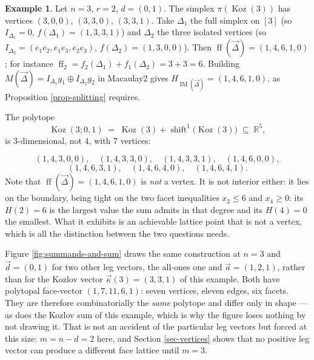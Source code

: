 \documentclass[11pt, a4paper, abstract=yes]{scrartcl}
\theoremstyle{definition}
\newtheorem{mexample}[definition]{Example}
\theoremstyle{remark}
\theoremstyle{plain}
\newcommand{\Koz}{\operatorname{Koz}}
\newcommand{\shift}{\operatorname{shift}}
\newcommand{\kozvec}{\vec\kappa}
\newcommand{\proj}{\pi}
\newcommand{\ff}{\operatorname{ff}}
\newcommand{\IM}{\operatorname{IM}}
\begin{document}
\begin{mexample}
Let \(n=3\), \(r=2\), \(d=(0,1)\). The simplex \(\proj(\Koz(3))\) has vertices \((3,0,0)\),
\((3,3,0)\), \((3,3,1)\).
Take \(\Delta_1\) the full simplex on \([3]\) (so \(I_{\Delta_1}=0\), \(f(\Delta_1)=(1,3,3,1)\)) and
\(\Delta_2\) the three isolated vertices (so \(I_{\Delta_2}=(e_1e_2,e_1e_3,e_2e_3)\),
\(f(\Delta_2)=(1,3,0,0)\)). Then \(\ff(\vec\Delta)=(1,4,6,1,0)\); for instance
\(\ff_2=f_2(\Delta_1)+f_1(\Delta_2)=3+3=6\). Building
\(M(\vec\Delta)=I_{\Delta_1}g_1\oplus I_{\Delta_2}g_2\) in Macaulay2 gives
\(H_{\IM(\vec\Delta)}=(1,4,6,1,0)\), as Proposition \ref{prop-splitting} requires.

The polytope
\begin{equation}\label{eq:worked}
  \Koz(3;0,1)\;=\;\Koz(3)+\shift^1\bigl(\Koz(3)\bigr)\;\subseteq\;\mathbb R^5 ,
\end{equation}
is \(3\)-dimensional, not \(4\),
with \(7\) vertices:

\begin{equation}\label{eq:worked-2}
  (1,4,3,0,0),\quad (1,4,3,3,0),\quad (1,4,3,3,1),\quad (1,4,6,0,0),
\end{equation}
\begin{equation}\label{eq:worked-3}
  (1,4,6,3,1),\quad (1,4,6,4,0),\quad (1,4,6,4,1).
\end{equation}
Note that \(\ff(\vec\Delta)=(1,4,6,1,0)\) is \emph{not} a vertex. It is not interior either: it lies on
the boundary, being tight on the two facet inequalities \(x_2\le6\) and \(x_4\ge0\): its
\(H(2)=6\) is the largest value the sum admits in that degree and its \(H(4)=0\) the smallest. What
it exhibits is an achievable lattice point that is not a vertex, which is all the distinction between
the two questions needs.

Figure \ref{fig:summands-and-sum} draws the same construction at \(n=3\) and \(\vec d=(0,1)\) for two
other leg vectors, the all-ones one and \(\vec a=(1,2,1)\), rather than for the Kozlov vector
\(\kozvec(3)=(3,3,1)\) of this example. Both have polytopal face-vector \((1,7,11,6,1)\): seven
vertices, eleven edges, six
facets. They are therefore combinatorially the \emph{same} polytope and differ only in shape --- as does
the Kozlov sum of this example, which is why the figure loses nothing by not drawing it. That is not
an accident of the particular leg vectors but forced at this size: \(m=n-d=2\) here, and
Section \ref{sec-vertices} shows that no positive leg vector can produce a different face lattice
until \(m=3\).
\label{ex-worked}
\end{mexample}
\end{document}
